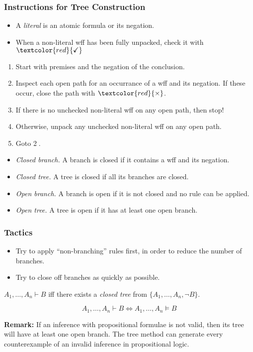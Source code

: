 \documentclass[UTF8,aspectratio=43,11pt,colorlinks,compress,openany]{beamer}%
\begin{document}
\begin{frame}\frametitle{Instructions for Tree Construction}
\begin{itemize}
	\item A \emph{literal} is an atomic formula or its negation.
	\item When a non-literal wff has been fully unpacked, check it with $\textcolor{red}{\checkmark}$
\end{itemize}
\begin{enumerate}
	\item Start with premises and the negation of the conclusion.
	\item Inspect each open path for an occurrance of a wff and its negation. If these occur, close the path with $\textcolor{red}{\times}$.
	\item If there is no unchecked non-literal wff on any open path, then stop!
	\item Otherwise, unpack any unchecked non-literal wff on any open path.
	\item Goto \textcircled{\footnotesize 2}.
\end{enumerate}
\begin{itemize}
	\item \emph{Closed branch.} A branch is closed if it contains a wff and its negation.
	\item \emph{Closed tree.} A tree is closed if all its branches are closed.
	\item \emph{Open branch.} A branch is open if it is not closed and no rule can be applied.
	\item \emph{Open tree.} A tree is open if it has at least one open branch.
\end{itemize}
\end{frame}

\begin{frame}\frametitle{Tactics}
\begin{itemize}
	\item Try to apply ``non-branching'' rules first, in order to reduce the number of branches.
	\item Try to close off branches as quickly as possible.
\end{itemize}
\begin{definition}[Deduction]
	$A_1,\dots, A_n\vdash B$ iff there exists a \emph{closed tree} from $\{A_1,\dots, A_n,\neg B\}$.
\end{definition}
\begin{theorem}
	\[A_1,\dots, A_n\vdash B\iff A_1,\dots, A_n\vDash B\]
\end{theorem}
	\textbf{Remark:} If an inference with propositional formulae is not valid, then its tree will have at least one open branch. The tree method can generate every counterexample of an invalid inference in propositional logic.
\end{frame}
\end{document}
